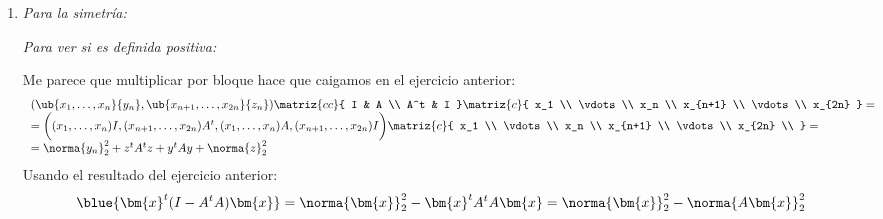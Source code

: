 \begin{enumerate}[label=\alph*)]
  \item \textit{Para la simetría:}

        \textit{Para ver si es definida positiva:}

        Me parece que multiplicar por bloque hace que caigamos en el ejercicio anterior:
        {\small
        $$
          \begin{array}{l}
            (\ub{x_1, \ldots, x_n}{y_n}, \ub{x_{n+1},  \ldots,  x_{2n}}{z_n})
            \matriz{cc}{
            I   & A \\
            A^t & I
            }
            \matriz{c}{
            x_1     \\
            \vdots  \\
            x_n     \\
            x_{n+1} \\
            \vdots  \\
              x_{2n}
            }
            =       \\
            =
            \bigg(
            (x_1,\ldots, x_n) I,
            (x_{n+1}, \ldots, x_{2n})A^t,
            (x_1, \ldots, x_n)A,
            (x_{n+1}, \ldots, x_{2n}) I
            \bigg)
            \matriz{c}{
            x_1     \\
            \vdots  \\
            x_n     \\
            x_{n+1} \\
            \vdots  \\
            x_{2n}  \\
            }
            =       \\
            =\norma{y_n}_2^2 + z^t A^t z + y^t A y + \norma{z}_2^2
          \end{array}
        $$
        }
        Usando el resultado del ejercicio anterior:
        $$
          \blue{\bm{x}^t (I - A^t A) \bm{x}} =
          \norma{\bm{x}}_2^2 - \bm{x}^t A^t A \bm{x}  =
          \norma{\bm{x}}_2^2 - \norma{A \bm{x}}_2^2
        $$
\end{enumerate}

\begin{aportes}
  \item {}
\end{aportes}
